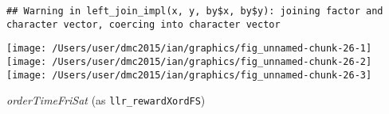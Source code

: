 \documentclass[10pt]{report}
\newenvironment{Shaded}{}{}
\newcommand{\KeywordTok}[1]{\textcolor[rgb]{0.00,0.44,0.13}{\textbf{{#1}}}}
\newcommand{\DataTypeTok}[1]{\textcolor[rgb]{0.56,0.13,0.00}{{#1}}}
\newcommand{\StringTok}[1]{\textcolor[rgb]{0.25,0.44,0.63}{{#1}}}
\newcommand{\NormalTok}[1]{{#1}}
\begin{document}
\begin{Shaded}
\end{Shaded}

\begin{verbatim}
## Warning in left_join_impl(x, y, by$x, by$y): joining factor and character vector, coercing into character vector
\end{verbatim}

\begin{Shaded}
\end{Shaded}

\begin{center}\texttt{[image: /Users/user/dmc2015/ian/graphics/fig\_unnamed-chunk-26-1]} \texttt{[image: /Users/user/dmc2015/ian/graphics/fig\_unnamed-chunk-26-2]} \texttt{[image: /Users/user/dmc2015/ian/graphics/fig\_unnamed-chunk-26-3]} \end{center}

\emph{orderTimeFriSat} (as \texttt{llr\_rewardXordFS})
\end{document}
